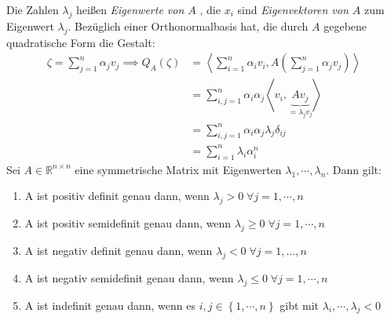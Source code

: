\documentclass[11pt, a4paper]{memoir}
\begin{document}
Die Zahlen $ \lambda_j $ heißen \textit{Eigenwerte von $ A $ }, die $ x_i $ sind \textit{ Eigenvektoren von $ A $ } zum Eigenwert 
$ \lambda_j $. Bezüglich einer Orthonormalbasis hat, die durch $ A $ gegebene quadratische Form die Gestalt:
\begin{align*} 
	\zeta = \sum_{j=1}^{n} \alpha_j v_j \implies Q_{A} \left(\zeta\right)  &= \left< \sum_{i = 1}^{n} \alpha_i v_i, A \left(
\sum_{j=1}^{n} \alpha_j v_j\right)  \right>\\
	&=  \sum_{i,j = 1}^{n} \alpha_i \alpha_j \left<v_i, \underbrace{ A v_j}_{= \lambda_j v_j} \right> \\
	&= \sum_{i,j = 1}^{n} \alpha_i \alpha_j \lambda_{j} \delta_{ij} \\
	&= \sum_{i=1}^{n} \lambda_i \alpha_{i}^{n}
\end{align*}
 Sei $ A \in  \mathbb{R}^{n \times n} $ eine symmetrische Matrix mit Eigenwerten $ \lambda_{1} , \cdots,  \lambda_{n} $. Dann gilt:
 \begin{enumerate}[label=\alph*)]
 	\item A ist positiv definit genau dann, wenn $ \lambda_j > 0 \; \forall j = 1 , \cdots,  n $ 
 	\item A ist positiv semidefinit genau dann, wenn $ \lambda_j \geq 0 \; \forall j = 1 , \cdots,  n $ 
 	\item A ist negativ definit genau dann, wenn $ \lambda_j < 0 \; \forall j = 1 , \ldots,  n $ 
 	\item A ist negativ semidefinit genau dann, wenn $ \lambda_j \leq  0 \; \forall j = 1 , \cdots,  n $ 
 	\item A ist  indefinit genau dann, wenn es $ i,j \in  \left\{ 1, \cdots,  n \right\}  $ gibt mit $ \lambda_i , \cdots, \lambda_j < 0 $ 
 \end{enumerate}
\end{document}
